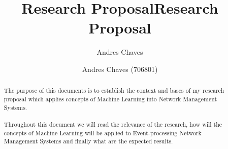\documentclass[10pt,a4paper]{article}
\author{Andres Chaves}
\title{Research Proposal}
\begin{document}
 \title{Research Proposal}
 \author{Andres Chaves (706801) \\
  }
 \maketitle

\begin{abstract}
    The purpose of this documents is to establish the context and bases of my research proposal which applies concepts of Machine Learning into Network Management Systems.
   \\\\
   Throughout this document we will read the relevance of the research, how will the concepts of Machine Learning will be applied to Event-processing Network Management Systems and finally what are the expected results.
\end{abstract}


\tableofcontents

  
\end{document}
